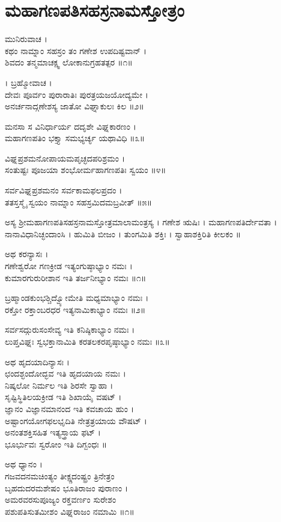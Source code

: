 \section{ಮಹಾಗಣಪತಿಸಹಸ್ರನಾಮಸ್ತೋತ್ರಂ }
ಮುನಿರುವಾಚ ।\\
ಕಥಂ ನಾಮ್ನಾಂ ಸಹಸ್ರಂ ತಂ ಗಣೇಶ ಉಪದಿಷ್ಟವಾನ್ ।\\
ಶಿವದಂ ತನ್ಮಮಾಚಕ್ಷ್ವ ಲೋಕಾನುಗ್ರಹತತ್ಪರ ॥೧॥

। ಬ್ರಹ್ಮೋವಾಚ ।\\
ದೇವಃ ಪೂರ್ವಂ ಪುರಾರಾತಿಃ ಪುರತ್ರಯಜಯೋದ್ಯಮೇ ।\\
ಅನರ್ಚನಾದ್ಗಣೇಶಸ್ಯ ಜಾತೋ ವಿಘ್ನಾಕುಲಃ ಕಿಲ ॥೨॥

ಮನಸಾ ಸ ವಿನಿರ್ಧಾರ್ಯ ದದೃಶೇ ವಿಘ್ನಕಾರಣಂ ।\\
ಮಹಾಗಣಪತಿಂ ಭಕ್ತ್ಯಾ ಸಮಭ್ಯರ್ಚ್ಯ ಯಥಾವಿಧಿ ॥೩॥

ವಿಘ್ನಪ್ರಶಮನೋಪಾಯಮಪೃಚ್ಛದಪರಿಶ್ರಮಂ ।\\
ಸಂತುಷ್ಟಃ ಪೂಜಯಾ ಶಂಭೋರ್ಮಹಾಗಣಪತಿಃ ಸ್ವಯಂ ॥೪॥

ಸರ್ವವಿಘ್ನಪ್ರಶಮನಂ ಸರ್ವಕಾಮಫಲಪ್ರದಂ ।\\
ತತಸ್ತಸ್ಮೈ ಸ್ವಯಂ ನಾಮ್ನಾಂ ಸಹಸ್ರಮಿದಮಬ್ರವೀತ್ ॥೫॥

ಅಸ್ಯ ಶ್ರೀಮಹಾಗಣಪತಿಸಹಸ್ರನಾಮಸ್ತೋತ್ರಮಾಲಾಮಂತ್ರಸ್ಯ । ಗಣೇಶ ಋಷಿಃ । ಮಹಾಗಣಪತಿರ್ದೇವತಾ । ನಾನಾವಿಧಾನಿಚ್ಛಂದಾಂಸಿ । ಹುಮಿತಿ ಬೀಜಂ । ತುಂಗಮಿತಿ ಶಕ್ತಿಃ । ಸ್ವಾಹಾಶಕ್ತಿರಿತಿ ಕೀಲಕಂ ॥

ಅಥ ಕರನ್ಯಾಸಃ ।\\
ಗಣೇಶ್ವರೋ ಗಣಕ್ರೀಡ ಇತ್ಯಂಗುಷ್ಠಾಭ್ಯಾಂ ನಮಃ ।\\
ಕುಮಾರಗುರುರೀಶಾನ ಇತಿ ತರ್ಜನೀಭ್ಯಾಂ ನಮಃ ॥೧॥

ಬ್ರಹ್ಮಾಂಡಕುಂಭಶ್ಚಿದ್ವ್ಯೋಮೇತಿ ಮಧ್ಯಮಾಭ್ಯಾಂ ನಮಃ ।\\
ರಕ್ತೋ ರಕ್ತಾಂಬರಧರ ಇತ್ಯನಾಮಿಕಾಭ್ಯಾಂ ನಮಃ ॥೨॥

ಸರ್ವಸದ್ಗುರುಸಂಸೇವ್ಯ ಇತಿ ಕನಿಷ್ಠಿಕಾಭ್ಯಾಂ ನಮಃ ।\\
ಲುಪ್ತವಿಘ್ನಃ ಸ್ವಭಕ್ತಾನಾಮಿತಿ ಕರತಲಕರಪೃಷ್ಠಾಭ್ಯಾಂ ನಮಃ ॥೩॥

ಅಥ ಹೃದಯಾದಿನ್ಯಾಸಃ ।\\
ಛಂದಶ್ಛಂದೋದ್ಭವ ಇತಿ ಹೃದಯಾಯ ನಮಃ ।\\
ನಿಷ್ಕಲೋ ನಿರ್ಮಲ ಇತಿ ಶಿರಸೇ ಸ್ವಾಹಾ ।\\
ಸೃಷ್ಟಿಸ್ಥಿತಿಲಯಕ್ರೀಡ ಇತಿ ಶಿಖಾಯೈ ವಷಟ್ ।\\
ಜ್ಞಾನಂ ವಿಜ್ಞಾನಮಾನಂದ ಇತಿ ಕವಚಾಯ ಹುಂ ।\\
ಅಷ್ಟಾಂಗಯೋಗಫಲಭೃದಿತಿ ನೇತ್ರತ್ರಯಾಯ ವೌಷಟ್ ।\\
ಅನಂತಶಕ್ತಿಸಹಿತ ಇತ್ಯಸ್ತ್ರಾಯ ಫಟ್ ।\\
ಭೂರ್ಭುವಃ ಸ್ವರೋಂ ಇತಿ ದಿಗ್ಬಂಧಃ ॥

ಅಥ ಧ್ಯಾನಂ ।\\
ಗಜವದನಮಚಿಂತ್ಯಂ ತೀಕ್ಷ್ಣದಂಷ್ಟ್ರಂ ತ್ರಿನೇತ್ರಂ\\
ಬೃಹದುದರಮಶೇಷಂ ಭೂತಿರಾಜಂ ಪುರಾಣಂ ।\\
ಅಮರವರಸುಪೂಜ್ಯಂ ರಕ್ತವರ್ಣಂ ಸುರೇಶಂ\\
ಪಶುಪತಿಸುತಮೀಶಂ ವಿಘ್ನರಾಜಂ ನಮಾಮಿ ॥೧॥


